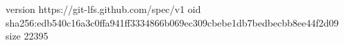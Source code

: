 version https://git-lfs.github.com/spec/v1
oid sha256:edb540c16a3c0ffa941ff3334866b069ec309cbebe1db7bedbecbb8ee44f2d09
size 22395
